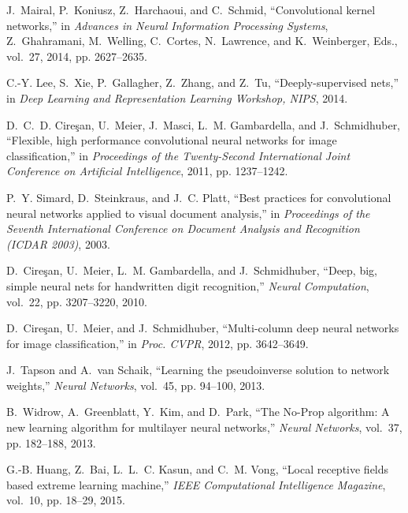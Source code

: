 \documentclass[conference]{IEEEtran}
\begin{document}
\begin{thebibliography}{10}
J.~Mairal, P.~Koniusz, Z.~Harchaoui, and C.~Schmid, ``Convolutional kernel
  networks,'' in \emph{Advances in Neural Information Processing Systems},
  Z.~Ghahramani, M.~Welling, C.~Cortes, N.~Lawrence, and K.~Weinberger, Eds.,
  vol.~27, 2014, pp. 2627--2635.

C.-Y. Lee, S.~Xie, P.~Gallagher, Z.~Zhang, and Z.~Tu, ``Deeply-supervised
  nets,'' in \emph{Deep Learning and Representation Learning Workshop, NIPS},
  2014.

D.~C.~D. Cire{\c{s}}an, U.~Meier, J.~Masci, L.~M. Gambardella, and
  J.~Schmidhuber, ``Flexible, high performance convolutional neural networks
  for image classification,'' in \emph{Proceedings of the Twenty-Second
  International Joint Conference on Artificial Intelligence}, 2011, pp.
  1237--1242.

P.~Y. Simard, D.~Steinkraus, and J.~C. Platt, ``Best practices for
  convolutional neural networks applied to visual document analysis,'' in
  \emph{Proceedings of the Seventh International Conference on Document
  Analysis and Recognition (ICDAR 2003)}, 2003.

D.~Cire{\c{s}}an, U.~Meier, L.~M. Gambardella, and J.~Schmidhuber, ``Deep, big,
  simple neural nets for handwritten digit recognition,'' \emph{Neural
  Computation}, vol.~22, pp. 3207--3220, 2010.

D.~Cire{\c{s}}an, U.~Meier, and J.~Schmidhuber, ``Multi-column deep neural
  networks for image classification,'' in \emph{Proc. CVPR}, 2012, pp.
  3642--3649.

J.~Tapson and A.~{van Schaik}, ``Learning the pseudoinverse solution to network
  weights,'' \emph{Neural Networks}, vol.~45, pp. 94--100, 2013.

B.~Widrow, A.~Greenblatt, Y.~Kim, and D.~Park, ``The {No-Prop} algorithm: {A}
  new learning algorithm for multilayer neural networks,'' \emph{Neural
  Networks}, vol.~37, pp. 182--188, 2013.

G.-B. Huang, Z.~Bai, L.~L.~C. Kasun, and C.~M. Vong, ``Local receptive fields
  based extreme learning machine,'' \emph{IEEE Computational Intelligence
  Magazine}, vol.~10, pp. 18--29, 2015.

\end{thebibliography}
\end{document}
